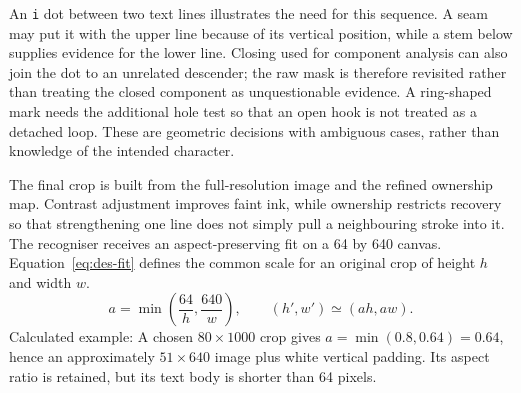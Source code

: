 \begin{designalgorithm}
\caption{Refining seam bands into ink ownership~\cite{brauneevidence2026,braunepipeline2026}}
\label{alg:des-ownership}
\begin{designpseudo}
\end{designpseudo}
\end{designalgorithm}

An \texttt{i} dot between two text lines illustrates the need for this sequence. A seam may put it with the upper line because of its vertical position, while a stem below supplies evidence for the lower line. Closing used for component analysis can also join the dot to an unrelated descender; the raw mask is therefore revisited rather than treating the closed component as unquestionable evidence. A ring-shaped mark needs the additional hole test so that an open hook is not treated as a detached loop. These are geometric decisions with ambiguous cases, rather than knowledge of the intended character.~\cite[segment.py]{braunepipeline2026}

The final crop is built from the full-resolution image and the refined ownership map. Contrast adjustment improves faint ink, while ownership restricts recovery so that strengthening one line does not simply pull a neighbouring stroke into it. The recogniser receives an aspect-preserving fit on a 64 by 640 canvas. Equation~\ref{eq:des-fit} defines the common scale for an original crop of height $h$ and width $w$.
\begin{equation}
a=\min\left(\frac{64}{h},\frac{640}{w}\right),\qquad
(h',w')\simeq(ah,aw).
\label{eq:des-fit}
\end{equation}
Calculated example: A chosen $80\times1000$ crop gives $a=\min(0.8,0.64)=0.64$, hence an approximately $51\times640$ image plus white vertical padding. Its aspect ratio is retained, but its text body is shorter than 64 pixels. \cite[segment.py, FitFixedCanvas]{braunepipeline2026}

